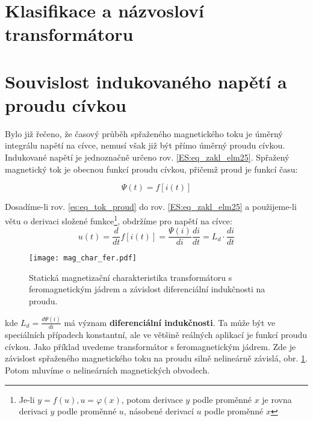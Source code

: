   \section{Klasifikace a názvosloví transformátoru}

  \section{Souvislost indukovaného napětí a proudu cívkou}
    Bylo již řečeno, že časový průběh spřaženého magnetického toku je úměrný integrálu napětí na 
    cívce, nemusí však již být přímo úměrný proudu cívkou. Indukované napětí je jednoznačně určeno 
    rov. \ref{ES:eq_zakl_elm25}. Spřažený magnetický tok je obecnou funkcí proudu cívkou, přičemž 
    proud je
    funkcí času:
    
    \begin{equation}\label{es:eq_tok_proud}
      \Psi(t) = f[i(t)]
    \end{equation}           

    Dosadíme-li rov. \ref{es:eq_tok_proud} do rov. \ref{ES:eq_zakl_elm25} a použijeme-li větu o 
    derivaci složené funkce\footnote{Je-li $y = f(u), u = \varphi(x)$, potom derivace $y$ podle 
    proměnné $x$ je rovna derivaci $y$ podle proměnné $u$, násobené derivací $u$ podle proměnné 
    $x$}, obdržíme pro napětí na cívce:
    \begin{equation}\label{es_tok_deriv}
      u(t) = \frac{d}{dt} f[i(t)] = \frac{\Psi(i)}{di} \frac{di}{dt} = L_d \cdot \frac{di}{dt}
    \end{equation}

    \begin{figure}[ht!]  %
      \centering
      \texttt{[image: mag\_char\_fer.pdf]}
      \caption{Statická magnetizační charakteristika transformátoru s feromagnetickým jádrem a 
        závislost diferenciální indukčnosti na proudu. \cite[s.~5]{Elrev2005trafo}}
      \label{es:fig_mag_char_trafa_fer}
    \end{figure}
    
    kde $L_d=\frac{d\Psi(i)}{di}$ má význam \textbf{diferenciální indukčnosti}. Ta může být ve 
    speciálních případech konstantní, ale ve většině reálných aplikací je funkcí proudu cívkou. 
    Jako příklad uvedeme transformátor s feromagnetickým jádrem. Zde je závislost spřaženého 
    magnetického toku na proudu silně nelineárně závislá, obr. \ref{es:fig_mag_char_trafa_fer}. 
    Potom mluvíme o nelineárních magnetických obvodech.

